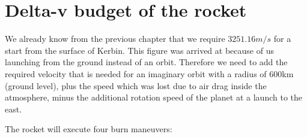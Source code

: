 \documentclass[12pt,paper=A4,numbers=noenddot,bibliography=totoc,listof=totoc,DIV=11,BCOR=1mm]{scrreprt}
\begin{document}
\section{Delta-v budget of the rocket}
We already know from the previous chapter that we require \hyperlink{kerbinrocketdrag}{$3251.16m/s$} for a start from the surface of Kerbin. This figure was arrived at because of us launching from the ground instead of an orbit. Therefore we need to add the required velocity that is needed for an imaginary orbit with a radius of 600km (ground level), plus the speed which was lost due to air drag inside the atmosphere, minus the additional rotation speed of the planet at a launch to the east.
\begin{flushleft}
The rocket will execute four burn maneuvers:
\end{flushleft}
\end{document}
